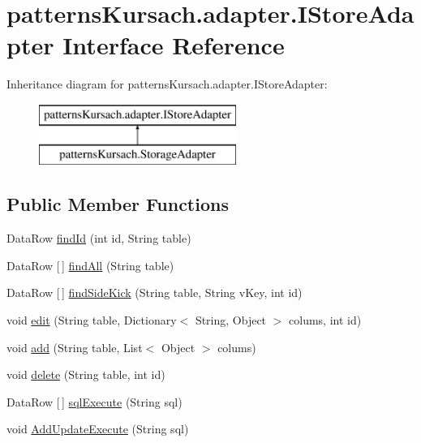\hypertarget{interfacepatterns_kursach_1_1adapter_1_1_i_store_adapter}{}\section{patterns\+Kursach.\+adapter.\+I\+Store\+Adapter Interface Reference}
\label{interfacepatterns_kursach_1_1adapter_1_1_i_store_adapter}
Inheritance diagram for patterns\+Kursach.\+adapter.\+I\+Store\+Adapter\+:\begin{figure}[H]
\begin{center}
\leavevmode
\includegraphics[height=2.000000cm]{interfacepatterns_kursach_1_1adapter_1_1_i_store_adapter}
\end{center}
\end{figure}
\subsection*{Public Member Functions}
\begin{DoxyCompactItemize}
\item 
Data\+Row \mbox{\hyperlink{interfacepatterns_kursach_1_1adapter_1_1_i_store_adapter_a23ec87fad2ed69f4aeb2cc98369dfcc0}{find\+Id}} (int id, String table)
\item 
Data\+Row \mbox{[}$\,$\mbox{]} \mbox{\hyperlink{interfacepatterns_kursach_1_1adapter_1_1_i_store_adapter_a13f0beab6001c24e72b16d3afa1c5f7a}{find\+All}} (String table)
\item 
Data\+Row \mbox{[}$\,$\mbox{]} \mbox{\hyperlink{interfacepatterns_kursach_1_1adapter_1_1_i_store_adapter_aa213143da13c4772d0aa695ece08b3ac}{find\+Side\+Kick}} (String table, String v\+Key, int id)
\item 
void \mbox{\hyperlink{interfacepatterns_kursach_1_1adapter_1_1_i_store_adapter_a68e63038dd5b807330386f8ac774896a}{edit}} (String table, Dictionary$<$ String, Object $>$ colums, int id)
\item 
void \mbox{\hyperlink{interfacepatterns_kursach_1_1adapter_1_1_i_store_adapter_a12816166876b9ddffa991a55d5e917c8}{add}} (String table, List$<$ Object $>$ colums)
\item 
void \mbox{\hyperlink{interfacepatterns_kursach_1_1adapter_1_1_i_store_adapter_a938d47744137644c9da0e8d745823238}{delete}} (String table, int id)
\item 
Data\+Row \mbox{[}$\,$\mbox{]} \mbox{\hyperlink{interfacepatterns_kursach_1_1adapter_1_1_i_store_adapter_a2f461380a248778258d993f8dc1eb265}{sql\+Execute}} (String sql)
\item 
void \mbox{\hyperlink{interfacepatterns_kursach_1_1adapter_1_1_i_store_adapter_ad1833d2efd297547ff34828468e914d2}{Add\+Update\+Execute}} (String sql)
\end{DoxyCompactItemize}


